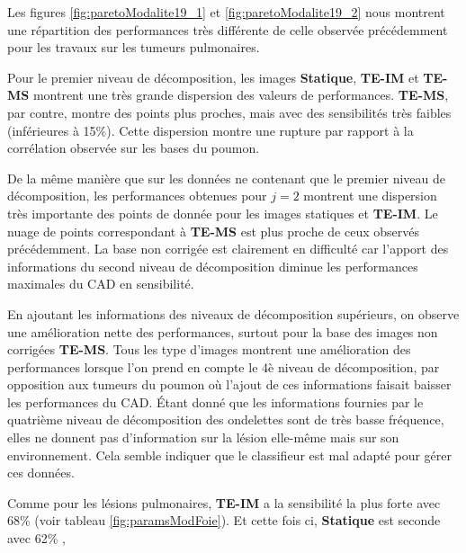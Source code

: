 Les figures \ref{fig:paretoModalite19_1} et \ref{fig:paretoModalite19_2} nous montrent une répartition des performances très différente de celle observée précédemment pour les travaux sur les tumeurs pulmonaires. 

Pour le premier niveau de décomposition, les images \textbf{Statique}, \textbf{TE-IM} et \textbf{TE-MS} montrent une très grande dispersion des valeurs de performances. \textbf{TE-MS}, par contre, montre des points plus proches, mais avec des sensibilités très faibles (inférieures à 15\%). Cette dispersion montre une rupture par rapport à la corrélation observée sur les bases du poumon.

De la même manière que sur les données ne contenant que le premier niveau de décomposition, les performances obtenues pour $j=2$ montrent une dispersion très importante des points de donnée pour les images statiques et \textbf{TE-IM}. Le nuage de points correspondant à \textbf{TE-MS} est plus proche de ceux observés précédemment. La base non corrigée est clairement en difficulté car l'apport des informations du second niveau de décomposition diminue les performances maximales du CAD en sensibilité.

En ajoutant les informations des niveaux de décomposition supérieurs, on observe une amélioration nette des performances, surtout pour la base des images non corrigées \textbf{TE-MS}. Tous les type d'images montrent une amélioration des performances lorsque l'on  prend en compte le 4è niveau de décomposition, par opposition aux tumeurs du poumon où l'ajout de ces informations faisait baisser les performances du CAD. \'Etant donné que les informations fournies par le quatrième niveau de décomposition des ondelettes sont de très basse fréquence, elles ne donnent pas d'information sur la lésion elle-même mais sur son environnement. Cela semble indiquer que le classifieur est mal adapté pour gérer ces données.


 Comme pour les lésions pulmonaires, \textbf{TE-IM} a la sensibilité la plus forte avec 68\% (voir tableau \ref{fig:paramsModFoie}). Et cette fois ci, \textbf{Statique} est seconde avec 62\% , 

